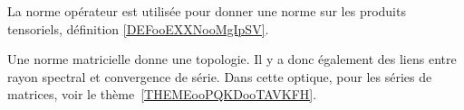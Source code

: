 La norme opérateur est utilisée pour donner une norme sur les produits tensoriels, définition \ref{DEFooEXXNooMgIpSV}.

Une norme matricielle donne une topologie. Il y a donc également des liens entre rayon spectral et convergence de série. Dans cette optique, pour les séries de matrices, voir le thème~\ref{THEMEooPQKDooTAVKFH}.
